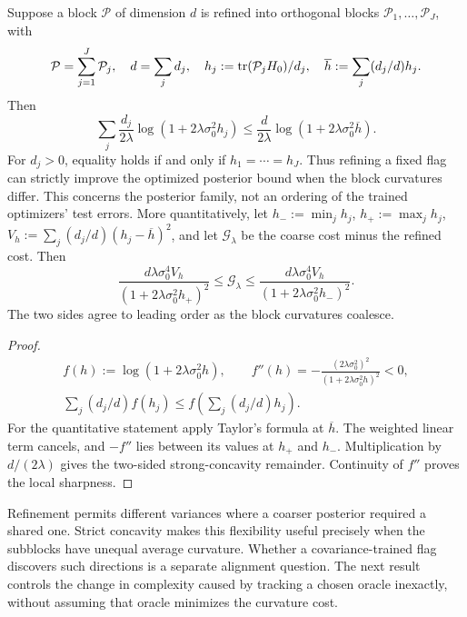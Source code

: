\begin{proposition}
\label{prop:directional-refinement}
Suppose a block $\mathcal P$ of dimension $d$ is refined into orthogonal blocks
$\mathcal P_1,\ldots,\mathcal P_J$, with
\begin{gather}
 \mathcal P=\sum_{j=1}^J\mathcal P_j,\quad d=\sum_jd_j,\quad
 h_j:=\operatorname{tr}(\mathcal P_jH_0)/d_j,\quad \overline h:=\sum_j(d_j/d)h_j.
\end{gather}
Then
\begin{equation}
 \sum_j\frac{d_j}{2\lambda}\log(1+2\lambda\sigma_0^2h_j)
 \le\frac d{2\lambda}\log(1+2\lambda\sigma_0^2\overline h).
\end{equation}
For $d_j>0$, equality holds if and only if $h_1=\cdots=h_J$. Thus refining a
fixed flag can strictly improve the optimized posterior bound when the block
curvatures differ. This concerns the posterior family, not an ordering of the
trained optimizers' test errors.
More quantitatively, let $h_-:=\min_jh_j$, $h_+:=\max_jh_j$,
$V_h:=\sum_j(d_j/d)(h_j-\overline h)^2$, and let $\mathcal G_\lambda$ be
the coarse cost minus the refined cost. Then
\begin{equation}
 \frac{d\lambda\sigma_0^4 V_h}{(1+2\lambda\sigma_0^2h_+)^2}
 \le\mathcal G_\lambda\le
 \frac{d\lambda\sigma_0^4 V_h}{(1+2\lambda\sigma_0^2h_-)^2}.
\end{equation}
The two sides agree to leading order as the block curvatures coalesce.
\end{proposition}
\begin{proof}
\begin{gather}
 f(h):=\log(1+2\lambda\sigma_0^2h),\qquad
 f''(h)=-\frac{(2\lambda\sigma_0^2)^2}{(1+2\lambda\sigma_0^2h)^2}<0,\\
 \sum_j(d_j/d)f(h_j)\le f(\sum_j(d_j/d)h_j).
\end{gather}
For the quantitative statement apply Taylor's formula at $\overline h$.
The weighted linear term cancels, and $-f''$ lies between its values at
$h_+$ and $h_-$. Multiplication by $d/(2\lambda)$ gives the two-sided
strong-concavity remainder. Continuity of $f''$ proves the local sharpness.
\end{proof}
Refinement permits different variances where a coarser posterior required a
shared one. Strict concavity makes this flexibility useful precisely when the
subblocks have unequal average curvature. Whether a covariance-trained flag
discovers such directions is a separate alignment question. The next result
controls the change in complexity caused by tracking a chosen oracle
inexactly, without assuming that oracle minimizes the curvature cost.

